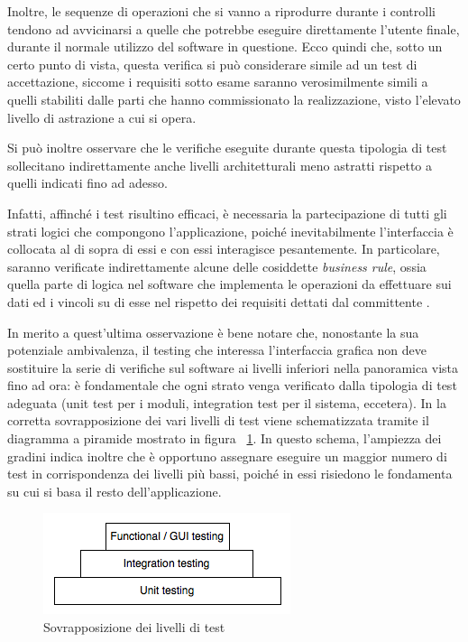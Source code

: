 Inoltre, le sequenze di operazioni che si vanno a riprodurre durante i controlli tendono ad avvicinarsi a quelle che potrebbe eseguire direttamente l'utente finale, durante il normale utilizzo del software in questione. Ecco quindi che, sotto un certo punto di vista, questa verifica si può considerare simile ad un test di accettazione, siccome i requisiti sotto esame saranno verosimilmente simili a quelli stabiliti dalle parti che hanno commissionato la realizzazione, visto l'elevato livello di astrazione a cui si opera.

Si può inoltre osservare che le verifiche eseguite durante questa tipologia di test sollecitano indirettamente anche livelli architetturali meno astratti rispetto a quelli indicati fino ad adesso. 

Infatti, affinché i test risultino efficaci, è necessaria la partecipazione di tutti gli strati logici che compongono l'applicazione, poiché inevitabilmente l'interfaccia è collocata al di sopra di essi e con essi interagisce pesantemente. In particolare, saranno verificate indirettamente alcune delle cosiddette \emph{business rule}, ossia quella parte di logica nel software che implementa le operazioni da effettuare sui dati ed i vincoli su di esse nel rispetto dei requisiti dettati dal committente \cite{agileRequirements}.

In merito a quest'ultima osservazione  è bene notare che, nonostante la sua potenziale ambivalenza, il testing che interessa l'interfaccia grafica non deve sostituire la serie di verifiche sul software ai livelli inferiori nella panoramica vista fino ad ora: è fondamentale che ogni strato venga verificato dalla tipologia di test adeguata (unit test per i moduli, integration test per il sistema, eccetera). In \cite{microsoft} la corretta sovrapposizione dei vari livelli di test viene schematizzata tramite il diagramma a piramide mostrato in figura ~\ref{fig:testPyramid}. In questo schema, l'ampiezza dei gradini indica inoltre che è opportuno assegnare eseguire un maggior numero di test in corrispondenza dei livelli più bassi, poiché in essi risiedono le fondamenta su cui si basa il resto dell'applicazione.

\begin{figure}[htbp]
\begin{center}
\includegraphics{images/test_pyramid.png}
\caption{Sovrapposizione dei livelli di test}
\label{fig:testPyramid}
\end{center}
\end{figure}

